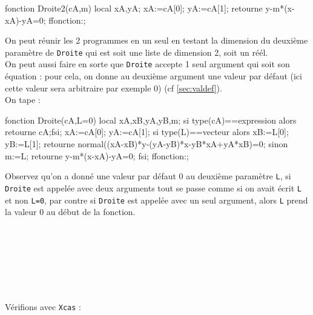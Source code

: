 \documentclass[12pt,a4paper]{book}
\begin{document}
\begin{giacjshere}
\begin{giacprog}
fonction Droite2(cA,m)
 local xA,yA;
 xA:=cA[0];
 yA:=cA[1];
 retourne y-m*(x-xA)-yA=0;
ffonction:;
\end{giacprog}
On peut r\'eunir les 2 programmes en un seul en testant la dimension du 
deuxi\`eme param\`etre de {\tt Droite} qui est soit une liste de dimension 2,
soit un r\'e\'el.\\
On peut aussi faire en sorte que {\tt Droite} accepte 1 seul argument qui soit 
son \'equation : pour cela, on donne au deuxi\`eme argument une valeur par 
d\'efaut (ici cette valeur sera arbitraire par exemple 0) (cf \ref{sec:valdef}).\\
On tape :
\begin{giaconload}
fonction Droite(cA,L=0)
 local xA,xB,yA,yB,m;
 si type(cA)==expression alors retourne cA;fsi;
 xA:=cA[0];
 yA:=cA[1];
 si type(L)==vecteur alors 
   xB:=L[0];
   yB:=L[1];
   retourne normal((xA-xB)*y-(yA-yB)*x-yB*xA+yA*xB)=0;
 sinon
   m:=L;
   retourne y-m*(x-xA)-yA=0;
 fsi;
ffonction:;
\end{giaconload}
Observez qu'on a donn\'e une valeur par d\'efaut 0 
au deuxi\`eme param\`etre \verb|L|, si \verb|Droite| est appel\'ee
avec deux arguments tout se passe comme si on avait \'ecrit
\verb|L| et non \verb|L=0|, par contre si \verb|Droite| est
appel\'ee avec un seul argument, alors \verb|L|  prend la valeur
0 au d\'ebut de la fonction.\\
\\
\\
\\
\\
\\
\\
\\
V\'erifions  avec {\tt Xcas} :\\
\\

\end{giacjshere}
\end{document}

